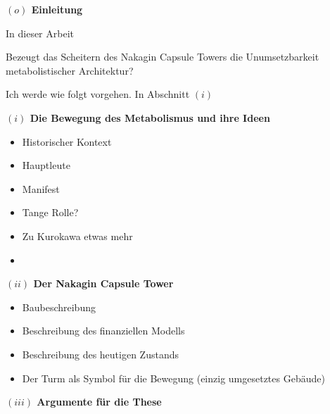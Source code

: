 \documentclass[a4paper, 12pt]{article}
\begin{document}
\begin{onehalfspace} 

\noindent\textbf{$(o)$ Einleitung}

\noindent In dieser Arbeit 

Bezeugt das Scheitern des Nakagin Capsule Towers die Unumsetzbarkeit metabolistischer Architektur?

\vspace{3mm}

Ich werde wie folgt vorgehen. In Abschnitt $(i)$ 

\vspace{5mm}
\noindent\textbf{$(i)$ Die Bewegung des Metabolismus und ihre Ideen} %

\begin{itemize}
  \item Historischer Kontext
  \item Hauptleute
  \item Manifest
  \item Tange Rolle?
  \item Zu Kurokawa etwas mehr
  \item  
\end{itemize}



\vspace{5mm}
\noindent\textbf{$(ii)$ Der Nakagin Capsule Tower}





\begin{itemize}
  \item Baubeschreibung
  \item Beschreibung des finanziellen Modells
  \item Beschreibung des heutigen Zustands 
  \item Der Turm als Symbol für die Bewegung (einzig umgesetztes Gebäude)
\end{itemize}



\vspace{5mm}
\noindent\textbf{$(iii)$ Argumente für die These}




\end{onehalfspace}
\end{document}

